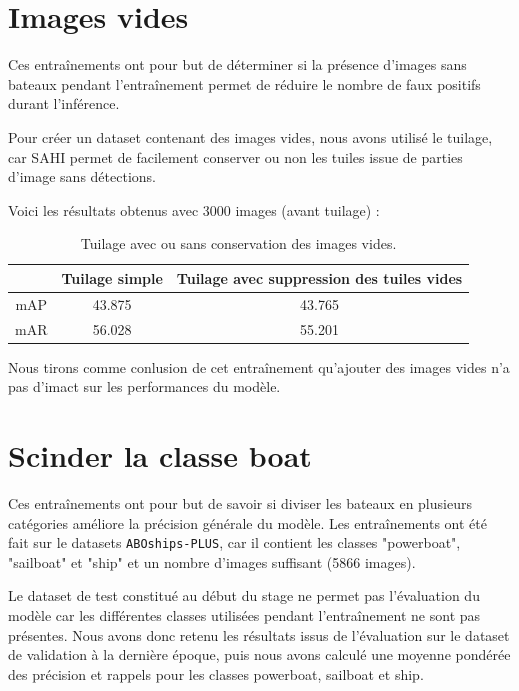 \section{Images vides}

Ces entraînements ont pour but de déterminer si la présence d'images sans bateaux pendant l'entraînement
permet de réduire le nombre de faux positifs durant l'inférence.

Pour créer un dataset contenant des images vides, nous avons utilisé le tuilage, car SAHI permet
de facilement conserver ou non les tuiles issue de parties d'image sans détections.

Voici les résultats obtenus avec 3000 images (avant tuilage) : \\

\begin{table}[h]
    \begin{center}
        \begin{tabular}{c c c}
            \hline
            & Tuilage simple & Tuilage avec suppression des tuiles vides \\
            \hline
            mAP & 43.875 & 43.765 \\
            mAR & 56.028 & 55.201 \\
        \end{tabular}
    \end{center}
    \caption{Tuilage avec ou sans conservation des images vides.}
\end{table}

Nous tirons comme conlusion de cet entraînement qu'ajouter des images vides
n'a pas d'imact sur les performances du modèle.

\section{Scinder la classe boat}

Ces entraînements ont pour but de savoir si diviser les bateaux en plusieurs
catégories améliore la précision générale du modèle.
Les entraînements ont été fait sur le datasets \texttt{ABOships-PLUS},
car il contient les classes "powerboat", "sailboat" et "ship"
et un nombre d'images suffisant (5866 images).

Le dataset de test constitué au début du stage ne permet pas l'évaluation du modèle
car les différentes classes utilisées pendant l'entraînement ne sont pas présentes.
Nous avons donc retenu les résultats issus de l'évaluation sur le dataset de validation
à la dernière époque, puis nous avons calculé une moyenne pondérée des précision
et rappels pour les classes powerboat, sailboat et ship. \\

